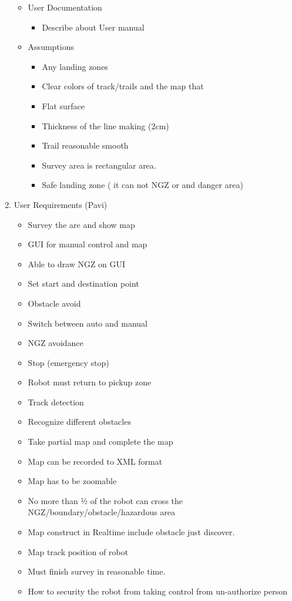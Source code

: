 \documentclass[11pt, a4paper]{article}
\begin{document}
\begin{enumerate}
\begin{itemize}
			\item User Documentation
			\begin{itemize}
				\item Describe about User manual
			\end{itemize}
		
			\item Assumptions
			\begin{itemize}
				\item	Any landing zones
				\item Clear colors of track/trails and the map that
				\item Flat surface
				\item Thickness of the line making (2cm)
				\item Trail reasonable smooth
				\item Survey area is rectangular area.
				\item Safe landing zone ( it can not NGZ or and danger area)
			\end{itemize}
		\end{itemize}
	
		\item User Requirements (Pavi)
		\begin{itemize}
			\item Survey the are and show map
			\item GUI for manual control and map
			\item Able to draw NGZ  on GUI
			\item Set start and destination point
			\item Obstacle avoid
			\item Switch between auto and manual
			\item NGZ avoidance
			\item Stop (emergency stop)
			\item Robot must return to pickup zone
			\item Track detection
			\item Recognize different obstacles
			\item Take partial map and complete the map
			\item Map can be recorded to XML format
			\item Map has to be zoomable 
			\item No more than ½ of the robot can cross the NGZ/boundary/obstacle/hazardous area
			\item Map construct in Realtime include obstacle just discover.
			\item Map track position of robot
			\item Must finish survey in reasonable time.
			\item How to security the robot from taking control from un-authorize person
		\end{itemize}
	

\end{enumerate}
\end{document}
